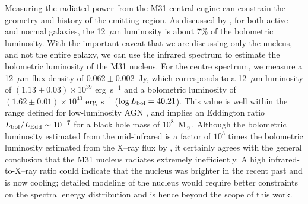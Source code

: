 %
%
%
%
%
%


Measuring the radiated power from the M31 central engine can constrain the geometry and history of the emitting region. 
As discussed by \citet{spinoglio95}, for both active and normal galaxies, the 12~$\mu$m luminosity 
is about 7\% of the bolometric luminosity. With the important caveat that we are discussing only the nucleus,
and not the entire galaxy, we  can use the infrared spectrum to estimate the bolometric luminosity  of the M31 nucleus.
For the centre spectrum, we measure a 12~$\mu$m flux density of 
$0.062 \pm 0.002$~Jy, which corresponds to a 12~$\mu$m luminosity of $(1.13\pm0.03) \times10^{39}$ erg~s$^{-1}$ and a bolometric luminosity
of  $(1.62\pm0.01) \times10^{40}$ erg~s$^{-1}$ ($\log L_{\rm bol} = 40.21$). 
This value is well within the range defined for low-luminosity AGN \citep[$\log L_{\rm bol} <42$,][]{Mason2012}, and
implies an Eddington ratio $L_{\rm bol}/L_{\rm Edd} \sim 10^{-7}$ for a black hole mass of $10^8$~M$_{\sun}$. 
Although the bolometric luminosity estimated from the mid-infrared is a factor of $10^3$ times the bolometric
luminosity estimated from the X--ray flux by \citet{Li09}, it certainly agrees with the general conclusion that the M31 nucleus radiates extremely inefficiently.
A high infrared-to-X--ray ratio could indicate that the nucleus was brighter in the recent past and is now cooling;
detailed modeling of the nucleus would require better constraints on the spectral energy distribution and is hence beyond the scope of this work.

